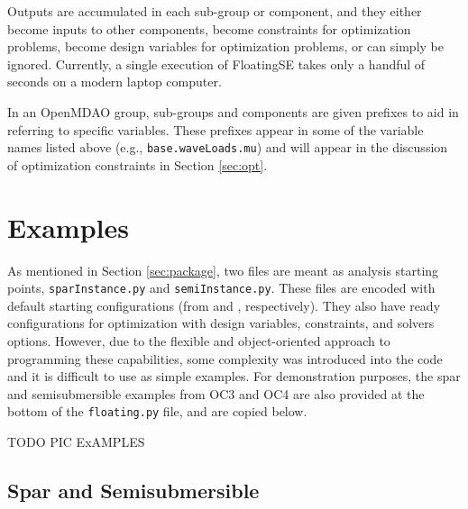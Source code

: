 Outputs are accumulated in each sub-group or component,
and they either become inputs to other components, become constraints
for optimization problems, become design variables for optimization
problems, or can simply be ignored.  Currently, a single execution of
FloatingSE takes only a handful of seconds on a modern laptop computer.

In an OpenMDAO group, sub-groups and components are given prefixes to
aid in referring to specific variables.  These prefixes appear in some
of the variable names listed above (e.g., \texttt{base.waveLoads.mu})
and will appear in the discussion of optimization constraints in Section
\ref{sec:opt}.

\section{Examples}
As mentioned in Section \ref{sec:package}, two files are meant as
analysis starting points, \texttt{sparInstance.py} and
\texttt{semiInstance.py}.  These files are encoded with default starting
configurations (from \citet{OC3} and \citet{OC4}, respectively).  They
also have ready configurations for optimization with design variables,
constraints, and solvers options.  However, due to the flexible and
object-oriented approach to programming these capabilities, some
complexity was introduced into the code and it is difficult to use as
simple examples.  For demonstration purposes, the spar and
semisubmersible examples from OC3 and OC4 are also provided at the
bottom of the \texttt{floating.py} file, and are copied below.

TODO PIC ExAMPLES

\subsection{Spar and Semisubmersible}

